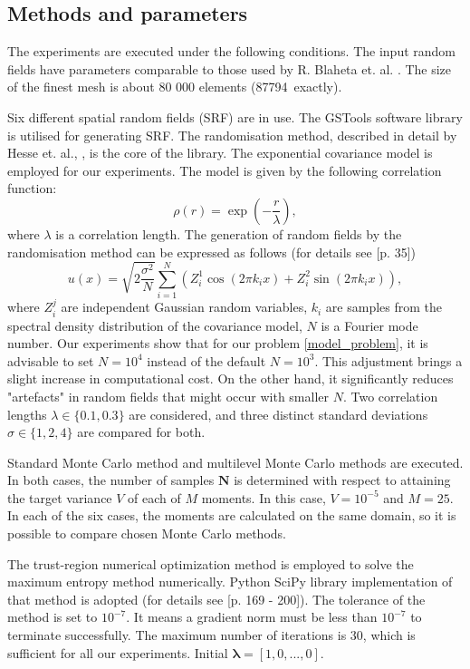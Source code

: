 \documentclass{article}
\def\vc#1{\mathbf{\boldsymbol{#1}}}     %
\def\vl{{\vc\lambda}}
\begin{document}
\subsection{Methods and parameters}
The experiments are executed under the following conditions.
The input random fields have parameters comparable to those used by R. Blaheta et. al. \cite{Blaheta20160413}. The size of the finest mesh is about 80 000 elements (87794~exactly). 

Six different spatial random fields (SRF) are in use. The GSTools software library \cite{GSTools} is utilised for generating SRF. The randomisation method, described in detail by Hesse et. al., \cite{Hesse2014}, is the core of the library. The exponential covariance model is employed for our experiments. The model is given by the following correlation function:
$$
\rho(r) = \exp\left(-\frac{r}{\lambda}\right),
$$
where $\lambda$ is a correlation length. The generation of random fields by the randomisation method can be expressed as follows (for details see  \cite{Hesse2014}[p. 35])
$$
u(x) = \sqrt{2 \frac{\sigma^2}{N}} \sum_{i=1}^{N}{\left( Z_i^1\cos(2\pi k_i x) + Z_i^2\sin(2\pi k_i x)   \right)},
$$
where $Z_i^j$ are independent Gaussian random variables, $k_i$ are samples from the spectral density distribution of the covariance model, $N$ is a Fourier mode number.
Our experiments show that for our problem \ref{model_problem}, it is advisable to set $N=10^4$ instead of the default $N=10^3$. This adjustment brings a slight increase in computational cost. On the other hand, it significantly reduces "artefacts" in random fields that might occur with smaller $N$. %
Two correlation lengths $\lambda \in \{0.1, 0.3\}$ are considered, and three distinct standard deviations $\sigma \in \{1, 2, 4\}$ are compared for both.

Standard Monte Carlo method and multilevel Monte Carlo methods are executed. In both cases, the number of samples $\vc N$ is determined with respect to attaining the target variance $V$ of each of $M$ moments. In this case, $V=10^{-5}$ and $M=25$. In each of the six cases, the moments are calculated on the same domain, so it is possible to compare chosen Monte Carlo methods.

The trust-region numerical optimization method is employed to solve the maximum entropy method numerically. %
Python SciPy library implementation of that method is adopted (for details see  \cite{Conn20000125}[p. 169 - 200]). The tolerance of the method is set to $10^{-7}$. It means a gradient norm must be less than $10^{-7}$ to terminate successfully. The maximum number of iterations is 30, which is sufficient for all our experiments. Initial $\vl = [1, 0, ..., 0]$. 
\end{document}
